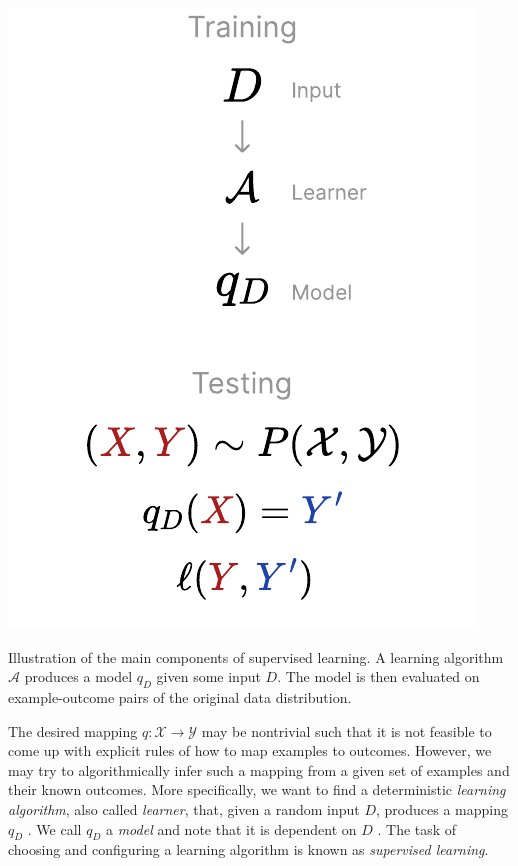 \documentclass[
	twoside=false, %
]{kaobook}
\begin{document}
\begin{marginfigure}
	\includegraphics[width=\textwidth]{figma-illustrations/supervised-learning}
	\label{fig:supervised-learning}
	\caption{Illustration of the main components of supervised learning. A learning algorithm $\mathcal{A}$ produces a model $q_D$ given some input $D$. The model is then evaluated on example-outcome pairs of the original data distribution.}
\end{marginfigure}

The desired mapping $q: \mathcal{X} \to \mathcal{Y}$ may be nontrivial such that it is not feasible to come up with explicit rules of how to map examples to outcomes. However, we may try to algorithmically infer such a mapping from a given set of examples and their known outcomes. More specifically, we want to find a deterministic \textit{learning algorithm}, also called \textit{learner}, that, given a random input $D$, produces a mapping $q_D$
.
We call $q_D$ a \textit{model} and note that it is dependent on $D$ .
The task of choosing and configuring a learning algorithm is known as \textit{supervised learning}.
\end{document}
